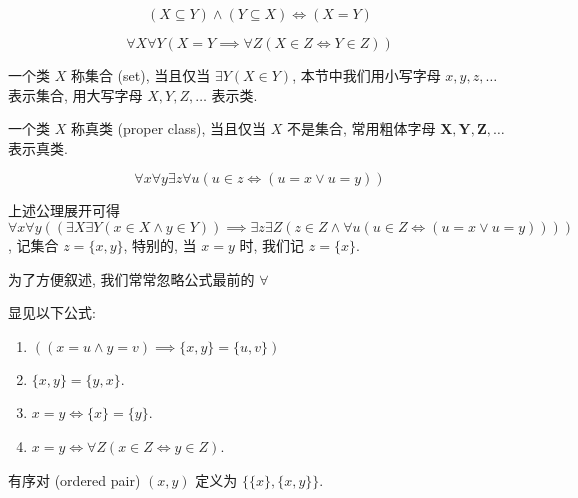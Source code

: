 \begin{corollary}
    \[
        (X \subseteq Y) \land (Y \subseteq X) \iff (X = Y)
    \]
\end{corollary}

\begin{axiom}
    \label {axiom:NBG Axiom of Equality}
    \[
        \forall X \forall Y (X = Y \implies \forall Z (X \in Z \iff Y \in Z))
    \]
\end{axiom}

\begin{definition}[集合]
    一个类 \(X\) 称集合 (set), 当且仅当 \(\exists Y (X \in Y)\), 本节中我们用小写字母 \(x, y, z, \dots\) 表示集合, 用大写字母 \(X, Y, Z, \dots\) 表示类.
\end{definition}

\begin{definition}[真类]
    一个类 \(X\) 称真类 (proper class), 当且仅当 \(X\) 不是集合, 常用粗体字母 \(\mathbf{X}, \mathbf{Y}, \mathbf{Z}, \dots\) 表示真类.
\end{definition}

\begin{axiom}
    \label {axiom:NBG Axiom of Pair}
    \[
        \forall x \forall y \exists z \forall u (u \in z \iff (u = x \lor u = y))
    \]
\end{axiom}

上述公理展开可得 \(\forall x \forall y ((\exists X \exists Y (x \in X \land y \in Y)) \implies \exists z \exists Z (z \in Z \land \forall u (u \in Z \iff (u = x \lor u = y))))\),
记集合 \(z = \{x,y\}\), 特别的, 当 \(x = y\) 时, 我们记 \(z = \{x\}\).

为了方便叙述, 我们常常忽略公式最前的 \(\forall\)

\begin{corollary}
    显见以下公式:

    \begin{enumerate}
        \item \(((x = u \land y = v) \implies \{x,y\} = \{u,v\})\)
        \item \(\{x,y\} = \{y,x\}\).
        \item \(x = y \iff \{x\} = \{y\}\).
        \item \(x = y \iff \forall Z (x \in Z \iff y \in Z)\).
    \end{enumerate}
\end{corollary}

\begin{definition}[有序对]
    \label {definition:Kuratowski ordered pair}
    有序对 (ordered pair) \((x,y)\) 定义为 \(\{\{x\},\{x,y\}\}\).
\end{definition}

